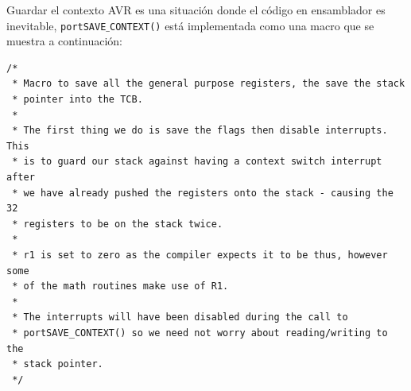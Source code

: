 \documentclass[12pt]{article}
\begin{document}
Guardar el contexto AVR es una situación donde el código en ensamblador 
es inevitable, {\tt portSAVE$\_$CONTEXT()} está implementada como una 
macro que se muestra a continuación:
\begin{verbatim}
/* 
 * Macro to save all the general purpose registers, the save the stack 
 * pointer into the TCB.  
 * 
 * The first thing we do is save the flags then disable interrupts.  This 
 * is to guard our stack against having a context switch interrupt after 
 * we have already pushed the registers onto the stack - causing the 32 
 * registers to be on the stack twice. 
 * 
 * r1 is set to zero as the compiler expects it to be thus, however some
 * of the math routines make use of R1. 
 * 
 * The interrupts will have been disabled during the call to 
 * portSAVE_CONTEXT() so we need not worry about reading/writing to the 
 * stack pointer. 
 */


\end{verbatim}
\end{document}
